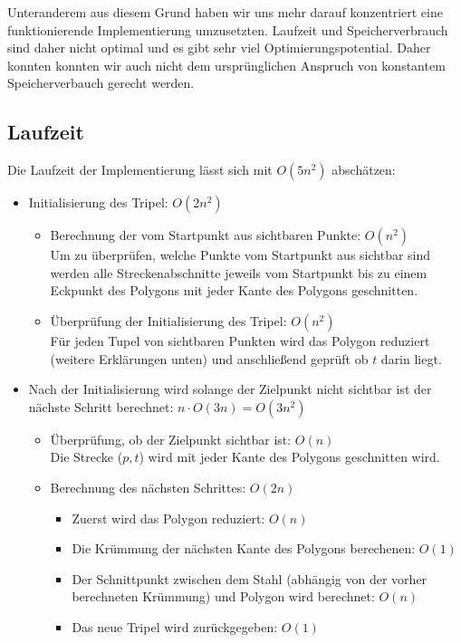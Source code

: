     Unteranderem aus diesem Grund haben wir uns mehr darauf konzentriert eine
    funktionierende Implementierung umzusetzten. Laufzeit und Speicherverbrauch
    sind daher nicht optimal und es gibt sehr viel Optimierungspotential. Daher konnten konnten wir auch nicht dem ursprünglichen Anspruch von konstantem Speicherverbauch gerecht werden.

\newpage
  \subsection{Laufzeit}

  Die Laufzeit der Implementierung lässt sich mit $O(5n^2)$ abschätzen:

  \begin{itemize}
  \item Initialisierung des Tripel: $O(2n^2)$
        \begin{itemize}
        \item Berechnung der vom Startpunkt aus sichtbaren Punkte: $O(n^2)$\\
        Um zu überprüfen, welche Punkte vom Startpunkt aus sichtbar sind
        werden alle Streckenabschnitte jeweils vom Startpunkt bis zu einem
        Eckpunkt des Polygons mit jeder Kante des Polygons geschnitten.
        \item Überprüfung der Initialisierung des Tripel: $O(n^2)$\\
        Für jeden Tupel von sichtbaren Punkten wird das Polygon reduziert
        (weitere Erklärungen unten) und anschließend geprüft ob $t$ darin liegt.
        \end{itemize}
  \item Nach der Initialisierung wird solange der Zielpunkt nicht sichtbar ist
        der nächste Schritt berechnet: $n \cdot O(3n) = O(3n^2)$
        \begin{itemize}
        \item Überprüfung, ob der Zielpunkt sichtbar ist: $O(n)$\\
        Die Strecke ($p,t$) wird mit jeder Kante des Polygons geschnitten wird.
        \item Berechnung des nächsten Schrittes: $O(2n)$
          \begin{itemize}
          \item Zuerst wird das Polygon reduziert: $O(n)$
          \item Die Krümmung der nächsten Kante des Polygons berechenen: $O(1)$
          \item Der Schnittpunkt zwischen dem Stahl (abhängig von der vorher
          berechneten Krümmung) und Polygon wird berechnet: $O(n)$
          \item Das neue Tripel wird zurückgegeben: $O(1)$
          \end{itemize}
        \end{itemize}
  \end{itemize}

